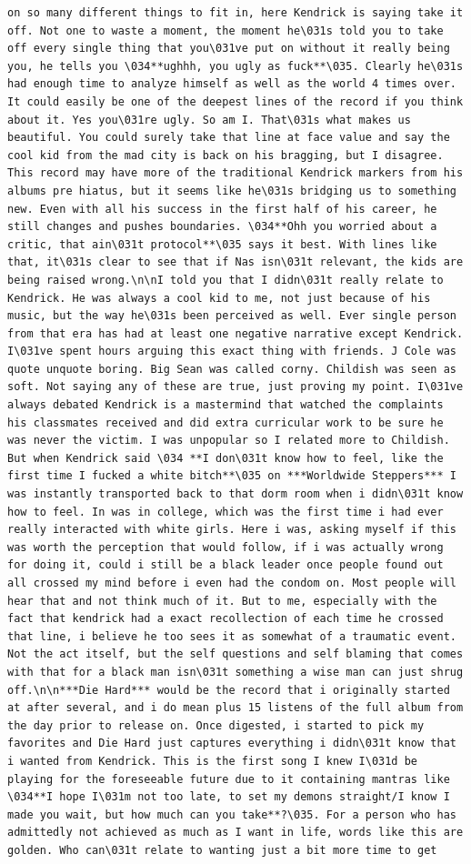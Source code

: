 \documentclass[
  letterpaper,
  DIV=11,
  numbers=noendperiod]{scrreprt}
\begin{document}
\begin{verbatim}
on so many different things to fit in, here Kendrick is saying take it off. Not one to waste a moment, the moment he\031s told you to take off every single thing that you\031ve put on without it really being you, he tells you \034**ughhh, you ugly as fuck**\035. Clearly he\031s had enough time to analyze himself as well as the world 4 times over. It could easily be one of the deepest lines of the record if you think about it. Yes you\031re ugly. So am I. That\031s what makes us beautiful. You could surely take that line at face value and say the cool kid from the mad city is back on his bragging, but I disagree. This record may have more of the traditional Kendrick markers from his albums pre hiatus, but it seems like he\031s bridging us to something new. Even with all his success in the first half of his career, he still changes and pushes boundaries. \034**Ohh you worried about a critic, that ain\031t protocol**\035 says it best. With lines like that, it\031s clear to see that if Nas isn\031t relevant, the kids are being raised wrong.\n\nI told you that I didn\031t really relate to Kendrick. He was always a cool kid to me, not just because of his music, but the way he\031s been perceived as well. Ever single person from that era has had at least one negative narrative except Kendrick. I\031ve spent hours arguing this exact thing with friends. J Cole was quote unquote boring. Big Sean was called corny. Childish was seen as soft. Not saying any of these are true, just proving my point. I\031ve always debated Kendrick is a mastermind that watched the complaints his classmates received and did extra curricular work to be sure he was never the victim. I was unpopular so I related more to Childish. But when Kendrick said \034 **I don\031t know how to feel, like the first time I fucked a white bitch**\035 on ***Worldwide Steppers*** I was instantly transported back to that dorm room when i didn\031t know how to feel. In was in college, which was the first time i had ever really interacted with white girls. Here i was, asking myself if this was worth the perception that would follow, if i was actually wrong for doing it, could i still be a black leader once people found out all crossed my mind before i even had the condom on. Most people will hear that and not think much of it. But to me, especially with the fact that kendrick had a exact recollection of each time he crossed that line, i believe he too sees it as somewhat of a traumatic event. Not the act itself, but the self questions and self blaming that comes with that for a black man isn\031t something a wise man can just shrug off.\n\n***Die Hard*** would be the record that i originally started at after several, and i do mean plus 15 listens of the full album from the day prior to release on. Once digested, i started to pick my favorites and Die Hard just captures everything i didn\031t know that i wanted from Kendrick. This is the first song I knew I\031d be playing for the foreseeable future due to it containing mantras like \034**I hope I\031m not too late, to set my demons straight/I know I made you wait, but how much can you take**?\035. For a person who has admittedly not achieved as much as I want in life, words like this are golden. Who can\031t relate to wanting just a bit more time to get 
\end{verbatim}
\end{document}
